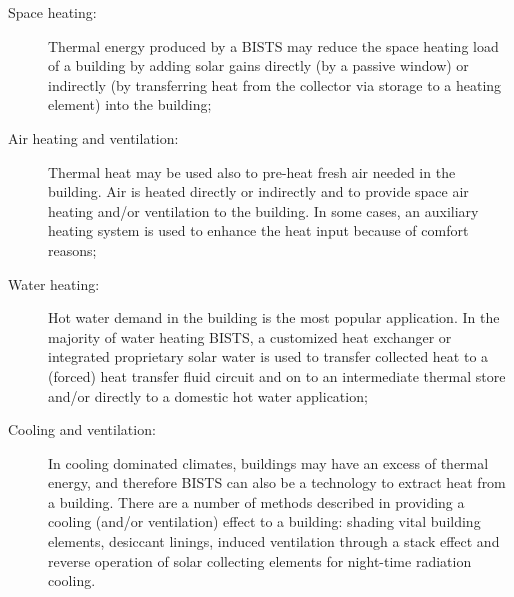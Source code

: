 \begin{description}
	\item[Space heating:] Thermal energy produced by a BISTS may reduce the space heating load of a building by adding solar gains directly (by a passive window) or indirectly (by transferring heat from the collector via storage to a heating element) into the building;
	
	\item[Air heating and ventilation:] Thermal heat may be used also to pre-heat fresh air needed in the building. Air is heated directly or	indirectly and to provide space air heating and/or ventilation to the building. In some cases, an auxiliary heating system is used to enhance the heat input because of comfort reasons;
	
	\item[Water heating:] Hot water demand in the building is the most popular application. In the majority of water heating BISTS, a customized heat exchanger or integrated proprietary solar water is used to transfer collected heat to a (forced) heat transfer fluid circuit and on to an intermediate thermal store and/or directly to a domestic hot water application;
	
	\item[Cooling and ventilation:] In cooling dominated climates, buildings may have an excess of thermal energy, and therefore BISTS can also be a technology to extract heat from a building. There are a number of methods described in providing a cooling (and/or ventilation) effect to a building: shading vital building elements, desiccant linings, induced ventilation through a stack effect and reverse operation of solar collecting elements for night-time radiation cooling.
\end{description}

